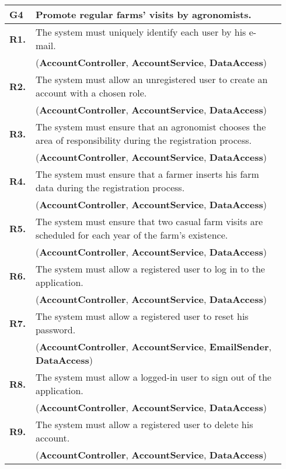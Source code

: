 \begin{longtable}{p{0.06\linewidth} p{0.88\linewidth}} 
    \toprule
    \textbf{G4} & Promote regular farms’ visits by agronomists. \\ 
    \midrule
	\textbf{R1.} & The system must uniquely identify each user by his e-mail. \\
	& (\textbf{AccountController}, \textbf{AccountService}, \textbf{DataAccess})\\
	\textbf{R2.} & The system must allow an unregistered user to create an account with a chosen role. \\
	& (\textbf{AccountController}, \textbf{AccountService}, \textbf{DataAccess})\\
	\textbf{R3.} & The system must ensure that an agronomist chooses the area of responsibility during the registration process. \\
	& (\textbf{AccountController}, \textbf{AccountService}, \textbf{DataAccess})\\
	\textbf{R4.} & The system must ensure that a farmer inserts his farm data during the registration process.\\
	& (\textbf{AccountController}, \textbf{AccountService}, \textbf{DataAccess})\\
	\textbf{R5.} & The system must ensure that two casual farm visits are scheduled for each year of the farm's existence.\\
	& (\textbf{AccountController}, \textbf{AccountService}, \textbf{DataAccess})\\
	\textbf{R6.} & The system must allow a registered user to log in to the application. \\
	& (\textbf{AccountController}, \textbf{AccountService}, \textbf{DataAccess})\\
	\textbf{R7.} & The system must allow a registered user to reset his password. \\
	& (\textbf{AccountController}, \textbf{AccountService}, \textbf{EmailSender}, \textbf{DataAccess})\\
	\textbf{R8.} & The system must allow a logged-in user to sign out of the application. \\
	& (\textbf{AccountController}, \textbf{AccountService}, \textbf{DataAccess})\\
	\textbf{R9.} & The system must allow a registered user to delete his account. \\
	& (\textbf{AccountController}, \textbf{AccountService}, \textbf{DataAccess})\\
	

\end{longtable}
